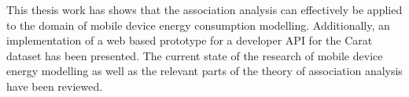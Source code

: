 


This thesis work has shows that the association analysis can effectively be applied to the domain of mobile device energy consumption modelling. Additionally, an implementation of a web based prototype for a developer API for the Carat dataset has been presented. The current state of the research of mobile device energy modelling as well as the relevant parts of the theory of association analysis have been reviewed.

